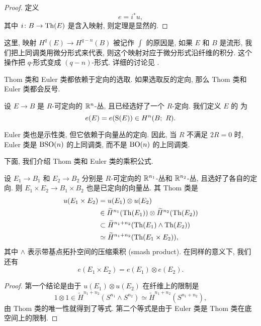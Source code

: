 \begin{proof}
    定义
    \[ e = i^* u, \]
    其中 $i \colon B \to \mathrm{Th}(E)$ 是含入映射, 则定理是显然的.
\end{proof}

这里, 映射 $H^q (E) \to H^{q - n} (B)$ 被记作 $\int$ 的原因是,
如果 $E$ 和 $B$ 是流形, 我们把上同调类用微分形式来代表,
则这个映射对应于微分形式沿纤维的积分.
这个操作把 $q$-形式变成 $(q - n)$-形式.
详细的讨论见 \cite{bott-tu}.

\begin{remark}
    Thom 类和 Euler 类都依赖于定向的选取.
    如果选取反的定向, 那么 Thom 类和 Euler 类都会反号. \varqed
\end{remark}

\begin{definition}
    设 $E \to B$ 是 $R$-可定向的 $\mathbb{R}^n$-丛, 且已经选好了一个 $R$-定向.
    我们定义 $E$ 的 为
    \[ e(E) = e(\upS(E)) \in H^n (B;\ R). \]
\end{definition}

Euler 类也是示性类, 但它依赖于向量丛的定向. 
因此, 当 $R$ 不满足 $2R = 0$ 时,
Euler 类是 $\mathrm{B}\mathrm{SO}(n)$ 的上同调类, 而不是 $\mathrm{B}\mathrm{O}(n)$ 的上同调类.

下面, 我们介绍 Thom 类和 Euler 类的乘积公式.

\begin{proposition} \label{thm-2-product}
    设 $E_1 \to B_1$ 和 $E_2 \to B_2$ 分别是 $R$-可定向的
    $\mathbb{R}^{n_1}$-丛和 $\mathbb{R}^{n_2}$-丛, 且选好了各自的定向.
    则 $E_1 \times E_2 \to B_1 \times B_2$
    也是已定向的向量丛. 其 Thom 类是
    \[ \begin{aligned}
        u (E_1 \times E_2)
        & = u (E_1) \otimes u(E_2) \\
        & \in \widetilde{H}^{n_1} (\mathrm{Th}(E_1)) \otimes \widetilde{H}^{n_2} (\mathrm{Th}(E_2)) \\
        & \subset \widetilde{H}^{n_1 + n_2} (\mathrm{Th}(E_1) \wedge \mathrm{Th}(E_2)) \\
        & \simeq \widetilde{H}^{n_1 + n_2} (\mathrm{Th}(E_1 \times E_2)),
    \end{aligned} \]
    其中 $\wedge$ 表示带基点拓扑空间的压缩乘积 (smash product). 在同样的意义下, 我们还有
    \[ e (E_1 \times E_2) = e (E_1) \otimes e (E_2). \]
\end{proposition}

\begin{proof}
    第一个结论是由于 $u (E_1) \otimes u (E_2)$ 在纤维上的限制是
    \[ 1 \otimes 1 \in \widetilde{H}^{n_1 + n_2} (S^{n_1} \wedge S^{n_2})
        \simeq \widetilde{H}^{n_1 + n_2} (S^{n_1 + n_2}), \]
    由 Thom 类的唯一性就得到了等式.
    第二个等式是由于 Euler 类是 Thom 类在底空间上的限制.
\end{proof}

